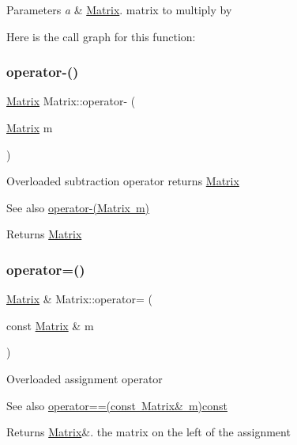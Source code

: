 \begin{DoxyParams}{Parameters}
{\em a} & \mbox{\hyperlink{class_matrix}{Matrix}}. matrix to multiply by \\
\hline
\end{DoxyParams}
Here is the call graph for this function\+:
\mbox{\label{class_matrix_a2aabf841a4302d528f8b102c0800a263}} 
\subsubsection{\texorpdfstring{operator-\/()}{operator-()}}
{\footnotesize\ttfamily \mbox{\hyperlink{class_matrix}{Matrix}} Matrix\+::operator-\/ (\begin{DoxyParamCaption}\item[{\mbox{\hyperlink{class_matrix}{Matrix}}}]{m }\end{DoxyParamCaption})}

Overloaded subtraction operator returns \mbox{\hyperlink{class_matrix}{Matrix}} \begin{DoxySeeAlso}{See also}
\mbox{\hyperlink{class_matrix_a2aabf841a4302d528f8b102c0800a263}{operator-\/(\+Matrix m)}} 
\end{DoxySeeAlso}
\begin{DoxyReturn}{Returns}
\mbox{\hyperlink{class_matrix}{Matrix}} 
\end{DoxyReturn}
\mbox{\label{class_matrix_aea5a06385f646eb4a63929fae6fa3e14}} 
\subsubsection{\texorpdfstring{operator=()}{operator=()}}
{\footnotesize\ttfamily \mbox{\hyperlink{class_matrix}{Matrix}} \& Matrix\+::operator= (\begin{DoxyParamCaption}\item[{const \mbox{\hyperlink{class_matrix}{Matrix}} \&}]{m }\end{DoxyParamCaption})}

Overloaded assignment operator \begin{DoxySeeAlso}{See also}
\mbox{\hyperlink{class_matrix_a35097c20bcb1495b57d452db0d7b1f53}{operator==(const Matrix\& m)const}} 
\end{DoxySeeAlso}
\begin{DoxyReturn}{Returns}
\mbox{\hyperlink{class_matrix}{Matrix}}\&. the matrix on the left of the assignment 
\end{DoxyReturn}

